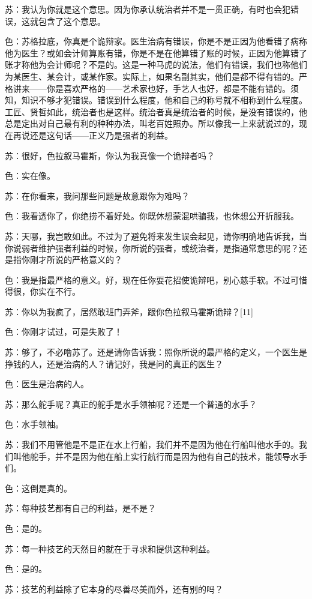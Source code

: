 \documentclass[12pt,oneside]{book}
\begin{document}
苏：我认为你就是这个意思。因为你承认统治者并不是一贯正确，有时也会犯错误，这就包含了这个意思。

色：苏格拉底，你真是个诡辩家。医生治病有错误，你是不是正因为他看错了病称他为医生？或如会计师算账有错，你是不是在他算错了账的时候，正因为他算错了账才称他为会计师呢？不是的。这是一种马虎的说法，他们有错误，我们也称他们为某医生、某会计，或某作家。实际上，如果名副其实，他们是都不得有错的。严格讲来——你是喜欢严格的——艺术家也好，手艺人也好，都是不能有错的。须知，知识不够才犯错误。错误到什么程度，他和自己的称号就不相称到什么程度。工匠、贤哲如此，统治者也是这样。统治者真是统治者的时候，是没有错误的，他总是定出对自己最有利的种种办法，叫老百姓照办。所以像我一上来就说过的，现在再说还是这句话——正义乃是强者的利益。

苏：很好，色拉叙马霍斯，你认为我真像一个诡辩者吗？

色：实在像。

苏：在你看来，我问那些问题是故意跟你为难吗？

色：我看透你了，你绝捞不着好处。你既休想蒙混哄骗我，也休想公开折服我。

苏：天哪，我岂敢如此。不过为了避免将来发生误会起见，请你明确地告诉我，当你说弱者维护强者利益的时候，你所说的强者，或统治者，是指通常意思的呢？还是指你刚才所说的严格意义的？

色：我是指最严格的意义。好，现在任你耍花招使诡辩吧，别心慈手软。不过可惜得很，你实在不行。

苏：你以为我疯了，居然敢班门弄斧，跟你色拉叙马霍斯诡辩？[11]

色：你刚才试过，可是失败了！

苏：够了，不必噜苏了。还是请你告诉我：照你所说的最严格的定义，一个医生是挣钱的人，还是治病的人？请记好，我是问的真正的医生？

色：医生是治病的人。

苏：那么舵手呢？真正的舵手是水手领袖呢？还是一个普通的水手？

色：水手领袖。

苏：我们不用管他是不是正在水上行船，我们并不是因为他在行船叫他水手的。我们叫他舵手，并不是因为他在船上实行航行而是因为他有自己的技术，能领导水手们。

色：这倒是真的。

苏：每种技艺都有自己的利益，是不是？

色：是的。

苏：每一种技艺的天然目的就在于寻求和提供这种利益。

色：是的。

苏：技艺的利益除了它本身的尽善尽美而外，还有别的吗？
\end{document}
